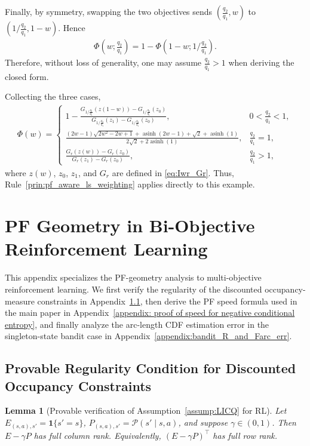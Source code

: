 \documentclass{article}
\newtheorem{lemma}{Lemma}
\newcommand{\Farc}{\Phi}
\begin{document}
Finally, by symmetry, swapping the two objectives sends $(\tfrac{q_2}{q_1},w)$ to $(1/\tfrac{q_2}{q_1},1-w)$. Hence
\begin{align}
\Farc(w;\tfrac{q_2}{q_1})=1-\Farc(1-w;1/\tfrac{q_2}{q_1}).
\label{eq:Farc_symmetry}
\end{align}
Therefore, without loss of generality, one may assume $\tfrac{q_2}{q_1}>1$ when deriving the closed form.

Collecting the three cases,
\begin{align}
\Farc(w)=
\begin{cases}
\displaystyle
1-\frac{G_{1/\tfrac{q_2}{q_1}}(z(1-w))-G_{1/\tfrac{q_2}{q_1}}(z_0)}{G_{1/\tfrac{q_2}{q_1}}(z_1)-G_{1/\tfrac{q_2}{q_1}}(z_0)},
& 0<\tfrac{q_2}{q_1}<1,\\
\displaystyle
\frac{
(2w-1)\sqrt{2w^2-2w+1}
+\operatorname{asinh}(2w-1)
+\sqrt2+\operatorname{asinh}(1)
}{
2\sqrt2+2\operatorname{asinh}(1)
},
& \tfrac{q_2}{q_1}=1,\\
\displaystyle
\frac{G_r(z(w))-G_r(z_0)}{G_r(z_1)-G_r(z_0)},
& \tfrac{q_2}{q_1}>1,
\end{cases}
\label{eq:Farc_cases}
\end{align}
where $z(w)$, $z_0$, $z_1$, and $G_r$ are defined in \eqref{eq:Iwr_Gr}. Thus, Rule~\ref{prin:pf_aware_ls_weighting} applies directly to this example.



\section{PF Geometry in Bi-Objective Reinforcement Learning}
\label{app:morl}
This appendix specializes the PF-geometry analysis to multi-objective reinforcement learning. We first verify the regularity of the discounted occupancy-measure constraints in Appendix~\ref{app:rank_condition}, then derive the PF speed formula used in the main paper in Appendix~\ref{appendix: proof of speed for negative conditional entropy}, and finally analyze the arc-length CDF estimation error in the singleton-state bandit case in Appendix~\ref{appendix:bandit_R_and_Farc_err}.

\subsection{Provable Regularity Condition for Discounted Occupancy Constraints}
\label{app:rank_condition}
\begin{lemma}[Provable verification of Assumption~\ref{assump:LICQ} for RL]
\label{lem:rank_E_minus_gamma_P}
Let $E_{(s,a),s'}=\mathbf 1\{s'=s\}$, $P_{(s,a),s'}=\mathcal P(s' \mid s,a)$, and suppose $\gamma\in(0,1)$. Then $E-\gamma P$ has full column rank. Equivalently, $(E-\gamma P)^\top$ has full row rank.
\end{lemma}
\end{document}
